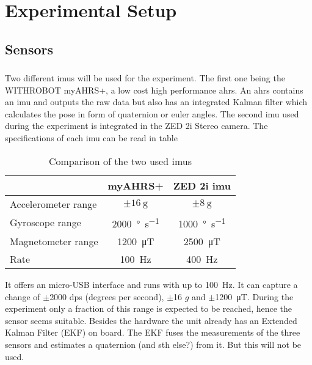 \chapter{Experimental Setup}
\label{ch:ExperimentalSetup}

\section{Sensors}
\subsection{}
Two different \gls{imu}s will be used for the experiment.
The first one being the WITHROBOT myAHRS+, a low cost high performance \gls{ahrs}.
An \gls{ahrs} contains an \gls{imu} and outputs the raw data but also has an integrated Kalman filter which calculates the pose in form of quaternion or euler angles.
The second \gls{imu} used during the experiment is integrated in the ZED 2i Stereo camera.
The specifications of each \gls{imu} can be read in table
\begin{table}[ht]
	\centering
	\caption{Comparison of the two used \gls{imu}s}
	\label{tab:imu_datasheets}
	\begin{tabular}[t]{lcc}
		\toprule
		&\textbf{myAHRS+} & \textbf{ZED 2i \gls{imu}}\\
		\midrule
		Accelerometer range			& $\pm\SI{16}{\g}$				& $\pm\SI{8}{\g}$\\
		Gyroscope range				& \SI{2000}{\degree\per\second}	& \SI{1000}{\degree\per\second}\\
		Magnetometer range			& \SI{1200}{\micro\tesla}		& \SI{2500}{\micro\tesla}\\
		Rate 						& \SI{100}{\hertz}				& \SI{400}{\hertz}\\
		\bottomrule
	\end{tabular}
\end{table}%
It offers an micro-USB interface and runs with up to \SI{100}{\Hz}.
It can capture a change of $\pm$2000 dps (degrees per second), $\pm$16 $g$ and $\pm$\SI{1200}{\micro\tesla}.
During the experiment only a fraction of this range is expected to be reached, hence the sensor seems suitable.
Besides the hardware the unit already has an Extended Kalman Filter (EKF) on board.
The EKF fuses the measurements of the three sensors and estimates a quaternion (and sth else?) from it.
But this will not be used.


